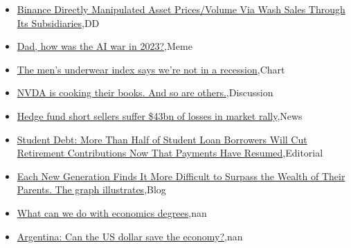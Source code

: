 \documentclass{article}%
\begin{document}
%
\begin{itemize}%
\item%
\href{https://reddit.com/r/wallstreetbets/comments/181zl1g/binance\_directly\_manipulated\_asset\_pricesvolume/}{Binance Directly Manipulated Asset Prices/Volume Via Wash Sales Through Its Subsidiaries},DD%
\item%
\href{https://reddit.com/r/wallstreetbets/comments/181uele/dad\_how\_was\_the\_ai\_war\_in\_2023/}{Dad, how was the AI war in 2023?},Meme%
\item%
\href{https://reddit.com/r/wallstreetbets/comments/181u1lo/the\_mens\_underwear\_index\_says\_were\_not\_in\_a/}{The men's underwear index says we're not in a recession},Chart%
\item%
\href{https://reddit.com/r/wallstreetbets/comments/181snlr/nvda\_is\_cooking\_their\_books\_and\_so\_are\_others/}{NVDA is cooking their books. And so are others.},Discussion%
\item%
\href{https://reddit.com/r/StockMarket/comments/181903o/hedge\_fund\_short\_sellers\_suffer\_43bn\_of\_losses\_in/}{Hedge fund short sellers suffer \$43bn of losses in market rally},News%
\item%
\href{https://reddit.com/r/Economics/comments/181ryu9/student\_debt\_more\_than\_half\_of\_student\_loan/}{Student Debt: More Than Half of Student Loan Borrowers Will Cut Retirement Contributions Now That Payments Have Resumed},Editorial%
\item%
\href{https://reddit.com/r/Economics/comments/181nrtk/each\_new\_generation\_finds\_it\_more\_difficult\_to/}{Each New Generation Finds It More Difficult to Surpass the Wealth of Their Parents. The graph illustrates},Blog%
\item%
\href{https://reddit.com/r/Economics/comments/181m2tr/what\_can\_we\_do\_with\_economics\_degrees/}{What can we do with economics degrees},nan%
\item%
\href{https://reddit.com/r/Economics/comments/181icnv/argentina\_can\_the\_us\_dollar\_save\_the\_economy/}{Argentina: Can the US dollar save the economy?},nan%
\end{itemize}%
\end{document}

